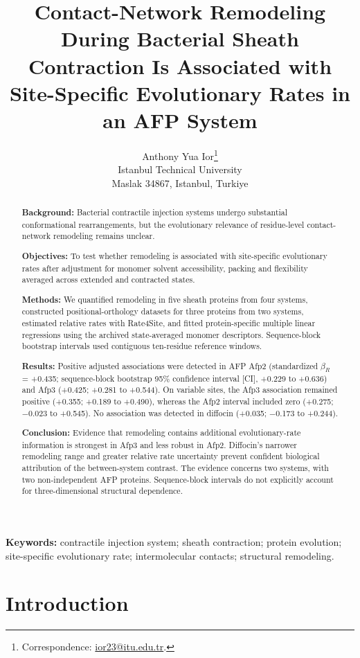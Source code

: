 \documentclass[11pt,a4paper]{article}
\title{Contact-Network Remodeling During Bacterial Sheath Contraction Is Associated with Site-Specific Evolutionary Rates in an AFP System}
\author{Anthony Yua Ior\thanks{Correspondence: \href{mailto:ior23@itu.edu.tr}{ior23@itu.edu.tr}.}\\[0.5em]
\small Istanbul Technical University\\
\small Maslak 34867, Istanbul, Turkiye}
\date{}
\begin{document}
\maketitle
\begin{abstract}

\textbf{Background:} Bacterial contractile injection systems undergo substantial conformational rearrangements, but the evolutionary relevance of residue-level contact-network remodeling remains unclear.

\textbf{Objectives:} To test whether remodeling is associated with site-specific evolutionary rates after adjustment for monomer solvent accessibility, packing and flexibility averaged across extended and contracted states.

\textbf{Methods:} We quantified remodeling in five sheath proteins from four systems, constructed positional-orthology datasets for three proteins from two systems, estimated relative rates with Rate4Site, and fitted protein-specific multiple linear regressions using the archived state-averaged monomer descriptors. Sequence-block bootstrap intervals used contiguous ten-residue reference windows.

\textbf{Results:} Positive adjusted associations were detected in AFP Afp2 (standardized \(\beta_R\) = +0.435; sequence-block bootstrap 95\% confidence interval [CI], +0.229 to +0.636) and Afp3 (+0.425; +0.281 to +0.544). On variable sites, the Afp3 association remained positive (+0.355; +0.189 to +0.490), whereas the Afp2 interval included zero (+0.275; \ensuremath{-}0.023 to +0.545). No association was detected in diffocin (+0.035; \ensuremath{-}0.173 to +0.244).

\textbf{Conclusion:} Evidence that remodeling contains additional evolutionary-rate information is strongest in Afp3 and less robust in Afp2. Diffocin's narrower remodeling range and greater relative rate uncertainty prevent confident biological attribution of the between-system contrast. The evidence concerns two systems, with two non-independent AFP proteins. Sequence-block intervals do not explicitly account for three-dimensional structural dependence.

\end{abstract}

\noindent\textbf{Keywords:} contractile injection system; sheath contraction; protein evolution; site-specific evolutionary rate; intermolecular contacts; structural remodeling.

\section{Introduction}
\end{document}
